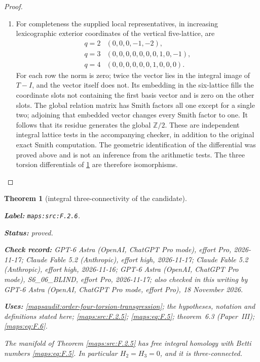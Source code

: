 \documentclass[11pt,a4paper]{article}
\newtheorem{theorem}{Theorem}[section]
\theoremstyle{definition}
\newcommand{\StatementRecord}[4]{\par\smallskip\begingroup\upshape\raggedright\noindent\textbf{Label:} \nolinkurl{#1}.\par\noindent\textbf{Status:} #2.\par\noindent\textbf{Check record:} #3.\par\noindent\textbf{Uses:} #4.\par\endgroup\smallskip}
\newcommand{\CurrentChecker}{GPT-6 Astra (OpenAI, ChatGPT Pro mode, effort Pro), 18 November 2026}
\newcommand{\ExternalPaperRef}[3]{\ifmmode\text{\upshape #1#2 (Paper~#3)}\else #1#2 (Paper~#3)\fi}
\begin{document}
\begin{proof}
\begin{enumerate}[label=\arabic*.]
\item For completeness the supplied local representatives, in increasing
lexicographic exterior coordinates of the vertical five-lattice, are
\[
\begin{array}{c|l}
q=2&(0,0,0,-1,-2),\\
q=3&(0,0,0,0,0,0,0,1,0,-1),\\
q=4&(0,0,0,0,0,0,1,0,0,0).
\end{array}
\]
For each row the norm is zero; twice the vector lies in the integral
image of $T-I$, and the vector itself does not. Its embedding in
the six-lattice fills the coordinate slots not containing the first
basis vector and is zero on the other slots. The global relation
matrix has Smith factors all one except for a single two; adjoining
that embedded vector changes every Smith factor to one. It follows
that its residue generates the global $\mathbb Z/2$. These are
independent integral lattice tests in the accompanying checker, in
addition to the original exact Smith computation. The geometric
identification of the differential was proved above and is not an
inference from the arithmetic tests. The three torsion differentials
of \ref{maps:src:F.2.6} are therefore isomorphisms.

\end{enumerate}
\end{proof}




\begin{theorem}[integral three-connectivity of the candidate]\label{maps:src:F.2.6}
\StatementRecord{maps:src:F.2.6}{proved}{GPT-6 Astra (OpenAI, ChatGPT Pro mode), effort Pro, 2026-11-17; Claude Fable 5.2 (Anthropic), effort high, 2026-11-17; Claude Fable 5.2 (Anthropic), effort high, 2026-11-16; GPT-6 Astra (OpenAI, ChatGPT Pro mode), S6\_06\_BLIND, effort Pro, 2026-11-17; also checked in this writing by \CurrentChecker}{\cref{mapsaudit:order-four-torsion-transgression}; the hypotheses, notation and definitions stated here; \cref{maps:src:F.2.5}; \cref{maps:eq:F.5}; \ExternalPaperRef{theorem~}{6.3}{III}; \cref{maps:eq:F.6}}


The manifold of Theorem \ref{maps:src:F.2.5} has free integral homology with
Betti numbers \eqref{maps:eq:F.5}.  In particular $H_2=H_3=0$, and it is
three-connected.

\end{theorem}
\end{document}

